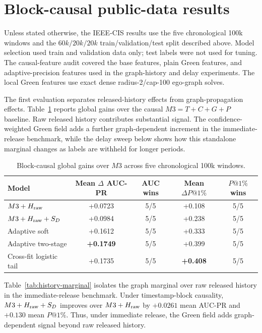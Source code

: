 \documentclass[11pt]{article}
\theoremstyle{definition}
\theoremstyle{remark}
\begin{document}
\section{Block-causal public-data results}
\label{sec:results}

Unless stated otherwise, the IEEE-CIS results use the five chronological 100k windows and the $60k/20k/20k$ train/validation/test split described above. Model selection used train and validation data only; test labels were not used for tuning. The causal-feature audit covered the base features, plain Green features, and adaptive-precision features used in the graph-history and delay experiments. The local Green features use exact dense radius-2/cap-100 ego-graph solves.

The first evaluation separates released-history effects from graph-propagation effects. Table~\ref{tab:global-m3} reports global gains over the causal $M3=T+C+G+P$ baseline. Raw released history contributes substantial signal. The confidence-weighted Green field adds a further graph-dependent increment in the immediate-release benchmark, while the delay sweep below shows how this standalone marginal changes as labels are withheld for longer periods.

\begin{table}[h]
\centering
\caption{Block-causal global gains over $M3$ across five chronological 100k windows.}
\label{tab:global-m3}
\begin{tabular}{lcccc}
\toprule
Model & Mean $\Delta$ AUC-PR & AUC wins & Mean $\Delta P@1\%$ & $P@1\%$ wins \\
\midrule
$M3+H_{\rm raw}$ & +0.0723 & 5/5 & +0.108 & 5/5 \\
$M3+H_{\rm raw}+S_D$ & +0.0984 & 5/5 & +0.238 & 5/5 \\
Adaptive soft & +0.1612 & 5/5 & +0.333 & 5/5 \\
Adaptive two-stage & \textbf{+0.1749} & 5/5 & +0.399 & 5/5 \\
Cross-fit logistic tail & +0.1735 & 5/5 & \textbf{+0.408} & 5/5 \\
\bottomrule
\end{tabular}
\end{table}

Table~\ref{tab:history-marginal} isolates the graph marginal over raw released history in the immediate-release benchmark. Under timestamp-block causality, $M3+H_{\rm raw}+S_D$ improves over $M3+H_{\rm raw}$ by $+0.0261$ mean AUC-PR and $+0.130$ mean $P@1\%$. Thus, under immediate release, the Green field adds graph-dependent signal beyond raw released history.
\end{document}
